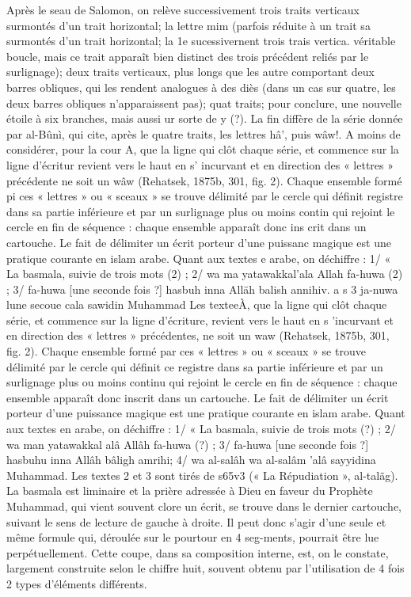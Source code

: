 Après le seau de Salomon, on relève successivement trois traits verticaux
surmontés d'un trait horizontal; la lettre mim (parfois réduite à un trait sa
surmontés d'un trait horizontal; la 1e sucessivernent trois trais vertica. véritable boucle, mais ce trait apparaît bien distinct des trois précédent reliés par le surlignage); deux traits verticaux, plus longs que les autre comportant deux barres obliques, qui les rendent analogues à des diès (dans un cas sur quatre, les deux barres obliques n'apparaissent pas); quat traits; pour conclure, une nouvelle étoile à six branches, mais aussi ur sorte de y (?). La fin diffère de la série donnée par al-Bûnì, qui cite, après le quatre traits, les lettres hâ', puis wâw!. A moins de considérer, pour la cour A, que la ligne qui clôt chaque série, et commence sur la ligne d'écritur revient vers le haut en s' incurvant et en direction des « lettres » précédente ne soit un wâw (Rehatsek, 1875b, 301, fig. 2). Chaque ensemble formé pi ces « lettres » ou « sceaux » se trouve délimité par le cercle qui définit registre dans sa partie inférieure et par un surlignage plus ou moins contin qui rejoint le cercle en fin de séquence : chaque ensemble apparaît donc ins crit dans un cartouche. Le fait de délimiter un écrit porteur d'une puissanc magique est une pratique courante en islam arabe. Quant aux textes e arabe, on déchiffre : 1/ « La basmala, suivie de trois mots (2) ; 2/ wa ma
yatawakkal'ala Allah fa-huwa (2) ; 3/ fa-huwa [une seconde fois ?] hasbuh
inna Alläh balish annihiv. a s 3 ja-nuwa lune secoue cala sawidin
Muhammad Les texteeÀ, que la ligne qui clôt chaque série, et commence sur la ligne d'écriture, revient vers le haut en s 'incurvant et en direction des « lettres » précédentes, ne soit un waw (Rehatsek, 1875b, 301, fig. 2). Chaque ensemble formé par ces « lettres » ou « sceaux » se trouve délimité par le cercle qui définit ce registre dans sa partie inférieure et par un surlignage plus ou moins continu qui rejoint le cercle en fin de séquence : chaque ensemble apparaît donc inscrit dans un cartouche. Le fait de délimiter un écrit porteur d'une puissance magique est une pratique courante en islam arabe. Quant aux textes en arabe, on déchiffre : 1/ « La basmala, suivie de trois mots (?) ; 2/ wa man
yatawakkal alâ Allâh fa-huwa (?) ; 3/ fa-huwa [une seconde fois ?] hasbuhu
inna Allâh bâligh amrihi; 4/ wa al-salâh wa al-salâm 'alâ sayyidina Muhammad. Les textes 2 et 3 sont tirés de s65v3 (« La Répudiation », al-talãg). La basmala est liminaire et la prière adressée à Dieu en faveur du Prophète Muhammad, qui vient souvent clore un écrit, se trouve dans le dernier cartouche, suivant le sens de lecture de gauche à droite. Il peut donc s'agir d'une seule et même formule qui, déroulée sur le pourtour en 4 seg-ments, pourrait être lue perpétuellement. Cette coupe, dans sa composition interne, est, on le constate, largement construite selon le chiffre huit, souvent obtenu par l'utilisation de 4 fois 2 types d'éléments différents.
 

